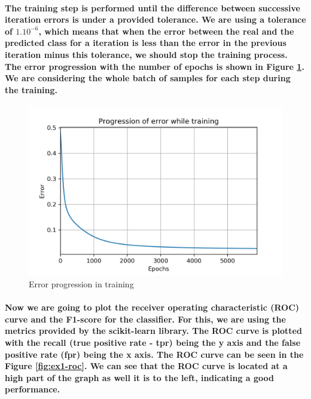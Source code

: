 \documentclass[a4paper]{article}    %
\begin{document}
\paragraph{The training step is performed until the difference between successive iteration errors is under a provided tolerance. We are using a tolerance of $1.10^{-6}$, which means that when the error between the real and the predicted class for a iteration is less than the error in the previous iteration minus this tolerance, we should stop the training process. The error progression with the number of epochs is shown in Figure \ref{fig:ex1-error}. We are considering the whole batch of samples for each step during the training.}

\begin{figure}[H]
    \centering
    \includegraphics[width=12cm]{error}
    \caption{Error progression in training}
    \label{fig:ex1-error}
\end{figure}

\paragraph{Now we are going to plot the receiver operating characteristic (ROC) curve and the F1-score for the classifier. For this, we are using the metrics provided by the scikit-learn library. The ROC curve is plotted with the recall (true positive rate - tpr) being the y axis and the false positive rate (fpr) being the x axis. The ROC curve can be seen in the Figure \ref{fig:ex1-roc}. We can see that the ROC curve is located at a high part of the graph as well it is to the left, indicating a good performance.}
\end{document}
